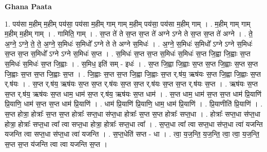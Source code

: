 \documentclass[17pt]{extarticle}
\begin{document}
\textbf{Ghana Paata } \newline

1. पय॑सा म॒हीम् म॒हीम् पय॑सा॒ पय॑सा म॒हीम् गाम् गाम् म॒हीम् पय॑सा॒ पय॑सा म॒हीम् गाम् । . म॒हीम् गाम् गाम् म॒हीम् म॒हीम् गाम् । . गामिति॒ गाम् । . स॒प्त ते॑ ते स॒प्त स॒प्त ते॑ अग्ने ऽग्ने ते स॒प्त स॒प्त ते॑ अग्ने । . ते॒ अ॒ग्ने॒ ऽग्ने॒ ते॒ ते॒ अ॒ग्ने॒ स॒मिधः॑ स॒मिधो᳚ ऽग्ने ते ते अग्ने स॒मिधः॑ । . अ॒ग्ने॒ स॒मिधः॑ स॒मिधो᳚ ऽग्ने ऽग्ने स॒मिधः॑ स॒प्त स॒प्त स॒मिधो᳚ ऽग्ने ऽग्ने स॒मिधः॑ स॒प्त । . स॒मिधः॑ स॒प्त स॒प्त स॒मिधः॑ स॒मिधः॑ स॒प्त जि॒ह्वा जि॒ह्वाः स॒प्त स॒मिधः॑ स॒मिधः॑ स॒प्त जि॒ह्वाः । . स॒मिध॒ इति॑ सम् - इधः॑ । . स॒प्त जि॒ह्वा जि॒ह्वाः स॒प्त स॒प्त जि॒ह्वाः स॒प्त स॒प्त जि॒ह्वाः स॒प्त स॒प्त जि॒ह्वाः स॒प्त । . जि॒ह्वाः स॒प्त स॒प्त जि॒ह्वा जि॒ह्वाः स॒प्त र्.ष॑य॒ ऋष॑यः स॒प्त जि॒ह्वा जि॒ह्वाः स॒प्त र्.ष॑यः । . स॒प्त र्.ष॑य॒ ऋष॑यः स॒प्त स॒प्त र्.ष॑यः स॒प्त स॒प्त र्.ष॑यः स॒प्त स॒प्त र्.ष॑यः स॒प्त । . ऋष॑यः स॒प्त स॒प्त र्.ष॑य॒ ऋष॑यः स॒प्त धाम॒ धाम॑ स॒प्त र्.ष॑य॒ ऋष॑यः स॒प्त धाम॑ । . स॒प्त धाम॒ धाम॑ स॒प्त स॒प्त धाम॑ प्रि॒याणि॑ प्रि॒याणि॒ धाम॑ स॒प्त स॒प्त धाम॑ प्रि॒याणि॑ । . धाम॑ प्रि॒याणि॑ प्रि॒याणि॒ धाम॒ धाम॑ प्रि॒याणि॑ । . प्रि॒याणीति॑ प्रि॒याणि॑ । . स॒प्त होत्रा॒ होत्राः᳚ स॒प्त स॒प्त होत्राः᳚ सप्त॒धा स॑प्त॒धा होत्राः᳚ स॒प्त स॒प्त होत्राः᳚ सप्त॒धा । . होत्राः᳚ सप्त॒धा स॑प्त॒धा होत्रा॒ होत्राः᳚ सप्त॒धा त्वा᳚ त्वा सप्त॒धा होत्रा॒ होत्राः᳚ सप्त॒धा त्वा᳚ । . स॒प्त॒धा त्वा᳚ त्वा सप्त॒धा स॑प्त॒धा त्वा॑ यजन्ति यजन्ति त्वा सप्त॒धा स॑प्त॒धा त्वा॑ यजन्ति । . स॒प्त॒धेति॑ सप्त - धा । . त्वा॒ य॒ज॒न्ति॒ य॒ज॒न्ति॒ त्वा॒ त्वा॒ य॒ज॒न्ति॒ स॒प्त स॒प्त य॑जन्ति त्वा त्वा यजन्ति स॒प्त । \newline
\end{document}

